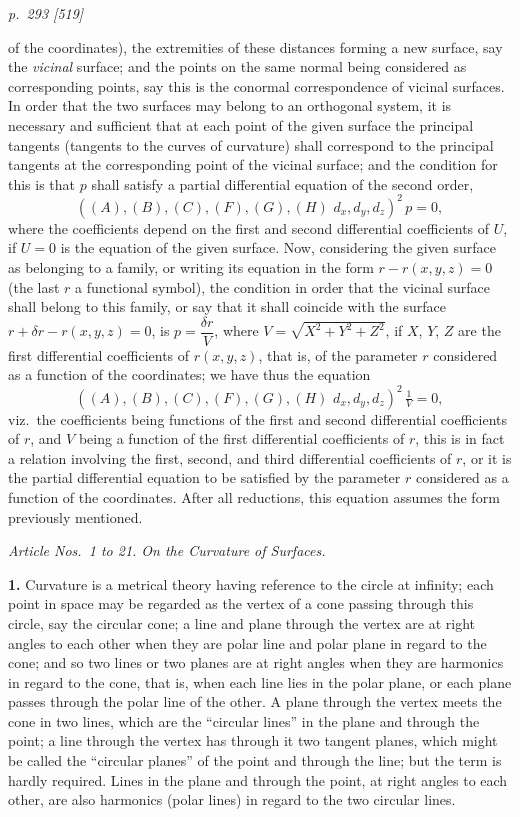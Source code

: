 \documentclass[11pt,a4paper]{article}
\theoremstyle{plain}
\begin{document}
\bigskip
\textit{p.~293 [519]}
\smallskip

\noindent of the coordinates), the extremities of these distances forming a new surface, say the
\textit{vicinal} surface; and the points on the same normal being considered as corresponding
points, say this is the conormal correspondence of vicinal surfaces.  In order that the
two surfaces may belong to an orthogonal system, it is necessary and sufficient that at
each point of the given surface the principal tangents (tangents to the curves of
curvature) shall correspond to the principal tangents at the corresponding point of the
vicinal surface; and the condition for this is that $p$ shall satisfy a partial differential
equation of the second order,
\[
((A), (B), (C), (F), (G), (H)\,\,d_x, d_y, d_z)^2\, p = 0,
\]
where the coefficients depend on the first and second differential coefficients of $U$, if
$U = 0$ is the equation of the given surface.  Now, considering the given surface as
belonging to a family, or writing its equation in the form $r - r(x, y, z) = 0$ (the last
$r$ a functional symbol), the condition in order that the vicinal surface shall belong to
this family, or say that it shall coincide with the surface $r + \delta r - r(x, y, z) = 0$, is $p = \dfrac{\delta r}{V}$,
where $V = \sqrt{X^2 + Y^2 + Z^2}$, if $X$, $Y$, $Z$ are the first differential coefficients of $r(x, y, z)$,
that is, of the parameter $r$ considered as a function of the coordinates; we have thus
the equation
\[
((A), (B), (C), (F), (G), (H)\,\,d_x, d_y, d_z)^2\, \tfrac{1}{V} = 0,
\]
viz.\ the coefficients being functions of the first and second differential coefficients of $r$,
and $V$ being a function of the first differential coefficients of $r$, this is in fact a
relation involving the first, second, and third differential coefficients of $r$, or it is the
partial differential equation to be satisfied by the parameter $r$ considered as a function
of the coordinates.  After all reductions, this equation assumes the form previously
mentioned.

\bigskip
\begin{center}\textit{Article Nos.\ 1 to 21. \quad On the Curvature of Surfaces.}\end{center}

\textbf{1.} Curvature is a metrical theory having reference to the circle at infinity; each
point in space may be regarded as the vertex of a cone passing through this circle,
say the circular cone; a line and plane through the vertex are at right angles to each
other when they are polar line and polar plane in regard to the cone; and so two
lines or two planes are at right angles when they are harmonics in regard to the
cone, that is, when each line lies in the polar plane, or each plane passes through
the polar line of the other.  A plane through the vertex meets the cone in two lines,
which are the ``circular lines'' in the plane and through the point; a line through
the vertex has through it two tangent planes, which might be called the ``circular
planes'' of the point and through the line; but the term is hardly required.  Lines
in the plane and through the point, at right angles to each other, are also harmonics
(polar lines) in regard to the two circular lines.
\end{document}
